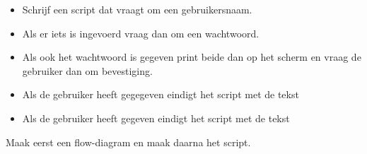 \begin{itemize}
\item Schrijf een script dat vraagt om een gebruikersnaam.
\item Als er iets is ingevoerd vraag dan om een wachtwoord.
\item Als ook het wachtwoord is gegeven print beide dan op het scherm en vraag de gebruiker dan om bevestiging.
\item Als de gebruiker  heeft gegegeven eindigt het script met de tekst 
\item Als de gebruiker  heeft gegeven eindigt het script met de tekst 
\end{itemize}

Maak eerst een flow-diagram en maak daarna het script.

